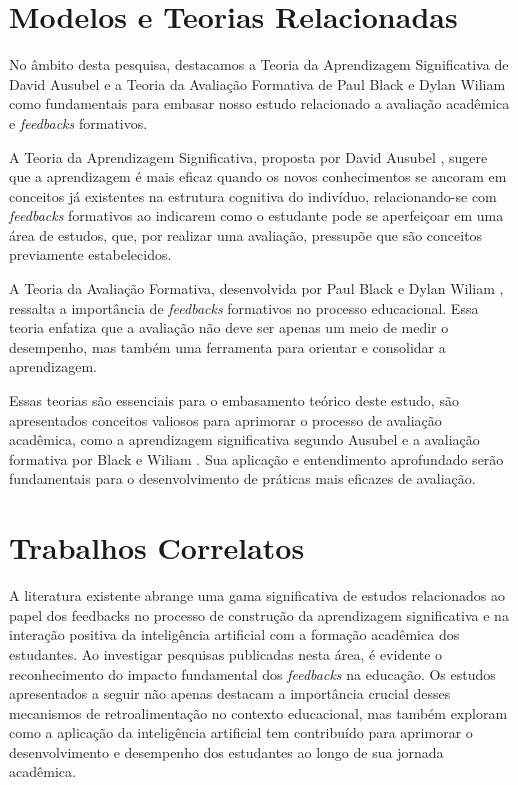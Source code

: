 \section{Modelos e Teorias Relacionadas}

No âmbito desta pesquisa, destacamos a Teoria da Aprendizagem Significativa de David Ausubel \cite{teorias} e a Teoria da Avaliação Formativa de Paul Black e Dylan Wiliam \cite{domingos2006} como fundamentais para embasar nosso estudo relacionado a avaliação acadêmica e \textit{feedbacks} formativos.

A Teoria da Aprendizagem Significativa, proposta por David Ausubel \cite{teorias}, sugere que a aprendizagem é mais eficaz quando os novos conhecimentos se ancoram em conceitos já existentes na estrutura cognitiva do indivíduo, relacionando-se com \textit{feedbacks} formativos ao indicarem como o estudante pode se aperfeiçoar em uma área de estudos, que, por realizar uma avaliação, pressupõe que são conceitos previamente estabelecidos.

A Teoria da Avaliação Formativa, desenvolvida por Paul Black e Dylan Wiliam \cite{domingos2006}, ressalta a importância de \textit{feedbacks} formativos no processo educacional. Essa teoria enfatiza que a avaliação não deve ser apenas um meio de medir o desempenho, mas também uma ferramenta para orientar e consolidar a aprendizagem. 

Essas teorias são essenciais para o embasamento teórico deste estudo, são apresentados conceitos valiosos para aprimorar o processo de avaliação acadêmica, como a aprendizagem significativa segundo Ausubel \cite{teorias} e a avaliação formativa por Black e Wiliam \cite{domingos2006}. Sua aplicação e entendimento aprofundado serão fundamentais para o desenvolvimento de práticas mais eficazes de avaliação.

\section{Trabalhos Correlatos}

A literatura existente abrange uma gama significativa de estudos relacionados ao papel dos feedbacks no processo de construção da aprendizagem significativa e na interação positiva da inteligência artificial com a formação acadêmica dos estudantes. Ao investigar pesquisas publicadas nesta área, é evidente o reconhecimento do impacto fundamental dos \textit{feedbacks} na educação. Os estudos apresentados a seguir não apenas destacam a importância crucial desses mecanismos de retroalimentação no contexto educacional, mas também exploram como a aplicação da inteligência artificial tem contribuído para aprimorar o desenvolvimento e desempenho dos estudantes ao longo de sua jornada acadêmica.

